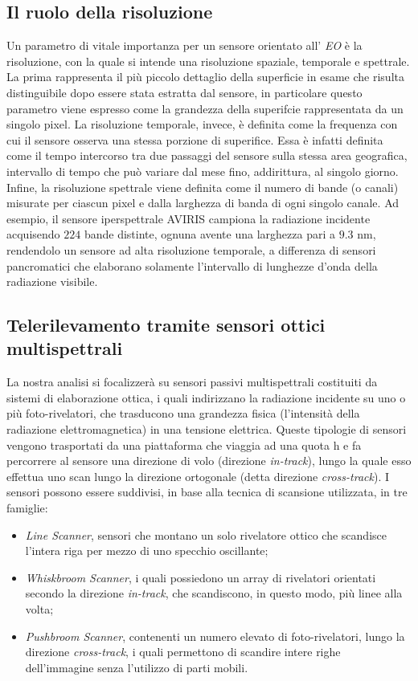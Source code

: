 \subsection{Il ruolo della risoluzione}
Un parametro di vitale importanza per un sensore orientato all' \emph{EO} è la risoluzione, con la quale si intende una risoluzione spaziale, temporale e spettrale.
La prima rappresenta il più piccolo dettaglio della superficie in esame che risulta distinguibile dopo essere stata estratta dal sensore, in particolare questo parametro viene espresso come la grandezza della superifcie rappresentata da un singolo pixel.
La risoluzione temporale, invece, è definita come la frequenza con cui il sensore osserva una stessa porzione di superifice. 
Essa è infatti definita come il tempo intercorso tra due passaggi del sensore sulla stessa area geografica, intervallo di tempo che può variare dal mese fino, addirittura, al singolo giorno.
Infine, la risoluzione spettrale viene definita come il numero di bande (o canali) misurate per ciascun pixel e dalla larghezza di banda di ogni singolo canale. Ad esempio, il sensore iperspettrale AVIRIS campiona la radiazione incidente acquisendo $224$ bande distinte, ognuna avente una larghezza pari a $9.3$ nm, rendendolo un sensore ad alta risoluzione temporale, a differenza di sensori pancromatici che elaborano solamente l'intervallo di lunghezze d'onda della radiazione visibile.


\subsection{Telerilevamento tramite sensori ottici multispettrali}
La nostra analisi si focalizzerà su sensori passivi multispettrali costituiti da sistemi di elaborazione ottica, i quali indirizzano la radiazione incidente su uno o più foto-rivelatori, che trasducono una grandezza fisica (l'intensità della radiazione elettromagnetica) in una tensione elettrica. Queste tipologie di sensori vengono trasportati da una piattaforma che viaggia ad una quota h e fa percorrere al sensore una direzione di volo (direzione \emph{in-track}), lungo la quale esso effettua uno scan lungo la direzione ortogonale (detta direzione \emph{cross-track}).
I sensori possono essere suddivisi, in base alla tecnica di scansione utilizzata, in tre famiglie:

\begin{itemize}
\item \emph{Line Scanner}, sensori che montano un solo rivelatore ottico che scandisce l'intera riga per mezzo di uno specchio oscillante;
\item \emph{Whiskbroom Scanner}, i quali possiedono un array di rivelatori orientati secondo la direzione \emph{in-track}, che scandiscono, in questo modo, più linee alla volta; 
\item \emph{Pushbroom Scanner}, contenenti un numero elevato di foto-rivelatori, lungo la direzione \emph{cross-track}, i quali permettono di scandire intere righe dell'immagine senza l'utilizzo di parti mobili.
\end{itemize}

